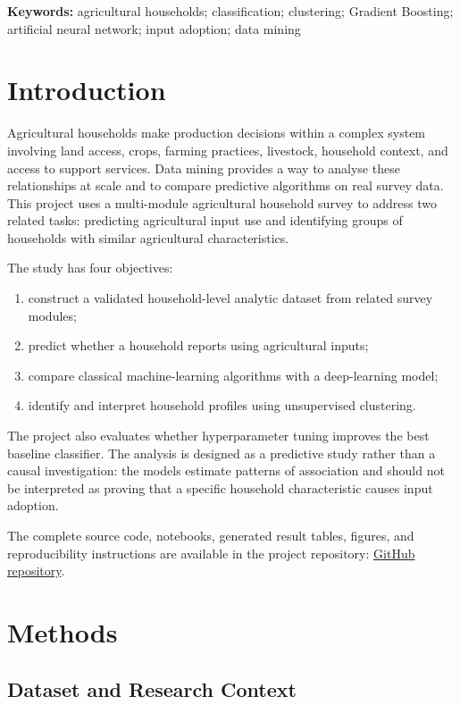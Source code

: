 \documentclass[12pt,a4paper]{article}
\newcommand{\repositoryurl}{https://github.com/Optimus44/Data-Mining/tree/main/Mid\%20-\%20Exam}
\begin{document}
\textbf{Keywords:} agricultural households; classification; clustering; Gradient Boosting; artificial neural network; input adoption; data mining

\newpage
\section{Introduction}

Agricultural households make production decisions within a complex system involving land access, crops, farming practices, livestock, household context, and access to support services. Data mining provides a way to analyse these relationships at scale and to compare predictive algorithms on real survey data. This project uses a multi-module agricultural household survey to address two related tasks: predicting agricultural input use and identifying groups of households with similar agricultural characteristics.

The study has four objectives:
\begin{enumerate}[leftmargin=2em]
    \item construct a validated household-level analytic dataset from related survey modules;
    \item predict whether a household reports using agricultural inputs;
    \item compare classical machine-learning algorithms with a deep-learning model;
    \item identify and interpret household profiles using unsupervised clustering.
\end{enumerate}

The project also evaluates whether hyperparameter tuning improves the best baseline classifier. The analysis is designed as a predictive study rather than a causal investigation: the models estimate patterns of association and should not be interpreted as proving that a specific household characteristic causes input adoption.

The complete source code, notebooks, generated result tables, figures, and reproducibility instructions are available in the project repository: \href{\repositoryurl}{GitHub repository}.

\section{Methods}

\subsection{Dataset and Research Context}
\end{document}
